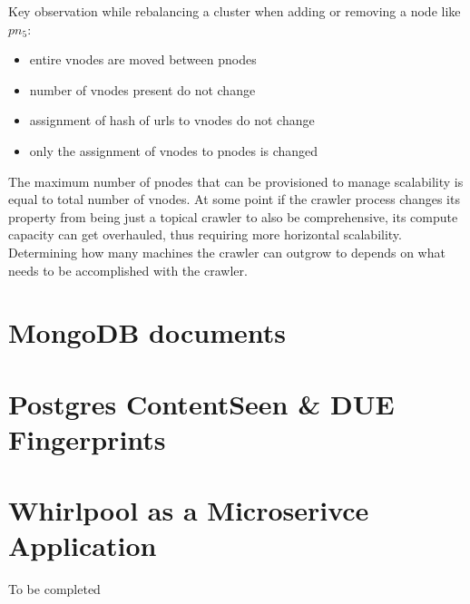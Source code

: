 \noindent
Key observation while rebalancing a cluster when adding or removing a node like $pn_5$:
\begin{itemize}
  \item entire vnodes are moved between pnodes
  \item number of vnodes present do not change 
  \item assignment of hash of urls to vnodes do not change
  \item only the assignment of vnodes to pnodes is changed
\end{itemize}

\noindent
The maximum number of pnodes that can be provisioned to manage scalability is equal to total number of
vnodes. At some point if the crawler process changes its property from being just a topical crawler to
also be comprehensive, its compute capacity can get overhauled, thus requiring more horizontal scalability.
Determining how many machines the crawler can outgrow to depends on what needs to be accomplished with the crawler.

\section{MongoDB documents}

\pagebreak

\section{Postgres ContentSeen \& DUE Fingerprints}

\pagebreak

\section{Whirlpool as a Microserivce Application}
To be completed

\pagebreak